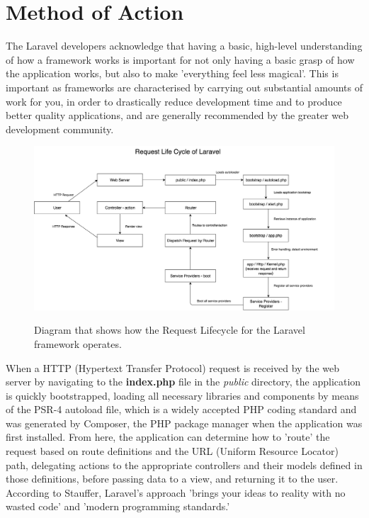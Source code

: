 \section{Method of Action}
The Laravel developers acknowledge that having a basic, high-level understanding of how a framework works is important for not only having a basic grasp of how the application works, but also to make 'everything feel less magical'. \cite{Laravel6} This is important as frameworks are characterised by carrying out substantial amounts of work for you, in order to drastically reduce development time and to produce better quality applications, and are generally recommended by the greater web development community. \cite{Mozilla3}

\begin{figure}[!ht]
    \includegraphics[width=1.0\textwidth]{Figures/laravel-request}
    \caption{Diagram that shows how the Request Lifecycle for the Laravel framework operates.}
    \label{fig:laravel-requests} \cite{Mallow1}
\end{figure}

When a HTTP (Hypertext Transfer Protocol) request is received by the web server by navigating to the \textbf{index.php} file in the \textit{public} directory, the application is quickly bootstrapped, loading all necessary libraries and components by means of the PSR-4 autoload file, which is a widely accepted PHP coding standard and was generated by Composer, the PHP package manager when the application was first installed. \cite{PSR1} From here, the application can determine how to 'route' the request based on route definitions and the URL (Uniform Resource Locator) path, delegating actions to the appropriate controllers and their models defined in those definitions, before passing data to a view, and returning it to the user. \cite{Laravel6} According to Stauffer, Laravel's approach 'brings your ideas to reality with no wasted code' and 'modern programming standards.' \cite{LaravelUp1}

